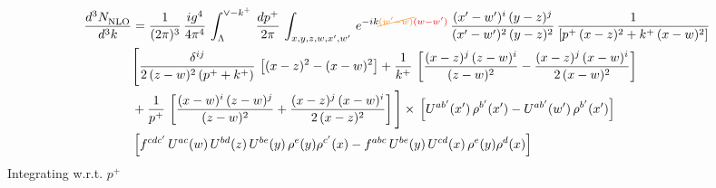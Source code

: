 \documentclass[9pt]{article}
\numberwithin{equation}{section}
\begin{document}
\begin{align}
    \frac{d^{3}N_{\rm NLO}^{\rm}}{d^{3}k}  & = \frac{1}{(2\pi)^{3}}\,\frac{ig^{4}}{4\pi^{4}}\, \int_{\Lambda}^{\vee-k^{+}}\, \frac{dp^{+}}{2\pi}\, \int_{x,y,z,w,x',w'}\,e^{-ik{\color{orange}\cancel{(w^\prime-w)}}{\color{red}(w-w^\prime)}}\, \frac{(x'-w')^{i}\,(y-z)^{j}}{(x'-w')^{2}\,(y-z)^{2}}\, \frac{1}{\left[p^{+}\,(x-z)^{2}+k^{+}\,(x-w)^{2}\right]}\notag \\ & \Bigg[\frac{\delta^{ij}}{2\,(z-w)^{2}\,(p^{+}+k^{+})}\, \left[(x-z)^{2}-(x-w)^{2}\right]+\frac{1}{k^{+}}\,\left[\frac{(x-z)^{j}\,(z-w)^{i}}{(z-w)^{2}}-\frac{(x-z)^{j}\,(x-w)^{i}}{2\,(x-w)^{2}}\right]\notag \\ & + \frac{1}{p^{+}}\, \left[\frac{(x-w)^{i}\,(z-w)^{j}}{(z-w)^{2}}+\frac{(x-z)^{j}\,(x-w)^{i}}{2\,(x-z)^{2}}\right]\Bigg]\times\, \left[U^{ab'}(x')\,\rho^{b'}(x')-U^{ab'}(w')\,\rho^{b'}(x')\right]\notag \\ & \left[f^{cdc'}\,U^{ac}(w)\,U^{bd}(z)\,U^{be}(y)\,\rho^{e}(y)\rho^{c'}(x)-f^{abc}\,U^{be}(y)\,U^{cd}(x)\,\rho^{e}(y)\rho^{d}(x)\right] %
\end{align}
Integrating w.r.t. $p^{+}$
\end{document}
